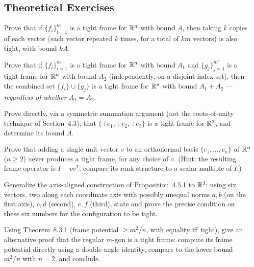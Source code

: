 \subsection*{Theoretical Exercises}
\begin{theoexercises}
	\item Prove that if $\{f_i\}_{i=1}^m$ is a tight frame for $\mathbb{R}^n$ with
	bound $A$, then taking $k$ copies of each vector (each vector
	repeated $k$ times, for a total of $km$ vectors) is also tight,
	with bound $kA$.
	
	\item Prove that if $\{f_i\}_{i=1}^m$ is a tight frame for $\mathbb{R}^n$ with
	bound $A_1$ and $\{g_j\}_{j=1}^{m'}$ is a tight frame for $\mathbb{R}^n$
	with bound $A_2$ (independently, on a disjoint index set), then
	the combined set $\{f_i\}\cup\{g_j\}$ is a tight frame for $\mathbb{R}^n$
	with bound $A_1+A_2$ --- \emph{regardless of whether $A_1=A_2$}.
	
	\item Prove directly, via a symmetric summation argument (not the
	roots-of-unity technique of Section~4.3), that
	$\{\pm e_1,\pm e_2,\pm e_3\}$ is a tight frame for $\mathbb{R}^3$, and
	determine its bound $A$.
	
	\item Prove that adding a single unit vector $v$ to an orthonormal
	basis $\{e_1,\ldots,e_n\}$ of $\mathbb{R}^n$ ($n\ge2$) never produces a
	tight frame, for any choice of $v$. (Hint: the resulting frame
	operator is $I+vv^T$; compare its rank structure to a scalar
	multiple of $I$.)
	
	\item Generalize the axis-aligned construction of
	Proposition~4.5.1 to $\mathbb{R}^3$: using six vectors, two along each
	coordinate axis with possibly unequal norms $a,b$ (on the first
	axis), $c,d$ (second), $e,f$ (third), state and prove the precise
	condition on these six numbers for the configuration to be tight.
	
	\item Using Theorem~8.3.1 (frame potential $\ge m^2/n$, with equality
	iff tight), give an alternative proof that the regular $m$-gon is
	a tight frame: compute its frame potential directly using a
	double-angle identity, compare to the lower bound $m^2/n$ with
	$n=2$, and conclude.
\end{theoexercises}

